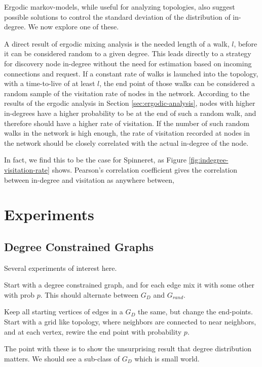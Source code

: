 \documentclass[a4paper,11pt,twocolumn]{article}
\begin{document}
Ergodic markov-models, while useful for analyzing topologies, also suggest
possible solutions to control the standard deviation of the distribution of
in-degree.  We now explore one of these.

A direct result of ergodic mixing analysis is the needed length of a walk, $l$,
before it can be considered random to a given degree.  This leads directly to a
strategy for discovery node in-degree without the need for estimation based on
incoming connections and request.  If a constant rate of walks is launched into
the topology, with a time-to-live of at least $l$, the end point of those walks
can be considered a random sample of the visitation rate of nodes in the
network.  According to the results of the ergodic analysis in Section
\ref{sec:ergodic-analysis}, nodes with higher in-degrees have a higher
probability to be at the end of such a random walk, and therefore should have a
higher rate of visitation.  If the number of such random walks in the network
is high enough, the rate of visitation recorded at nodes in the network should
be closely correlated with the actual in-degree of the node.

In fact, we find this to be the case for Spinneret, as Figure
\ref{fig:indegree-visitation-rate} shows.  Pearson's correlation coefficient
gives the correlation between in-degree and visitation as anywhere between, 

\section{Experiments}

\subsection{Degree Constrained Graphs}
Several experiments of interest here.  

\begin{enumeration}
	\item Start with a degree constrained graph,
and for each edge mix it with some other with prob $p$.  This should alternate
between $G_D$ and $G_{rand}$.
	\item Keep all starting vertices of edges in a $G_D$ the same, but change the
end-points.  Start with a grid like topology, where neighbors are connected to
near neighbors, and at each vertex, rewire the end point with probability $p$.
\end{enumeration}

The point with these is to show the unsurprising result that degree distribution
matters.  We should see a sub-class of $G_D$ which is small world.
\end{document}
